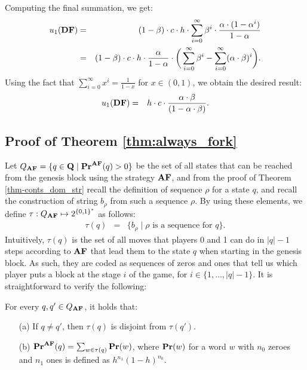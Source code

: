Computing the final summation, we get:
\begin{eqnarray*}	
u_1(\text{\rm {\bf DF}}) & = & (1-\beta) \cdot c \cdot h\cdot \sum_{i=0}^{\infty}\beta^{i} \cdot \frac{\alpha\cdot (1-\alpha^i)}{1-\alpha}\\
 & = & (1-\beta) \cdot c \cdot h\cdot \frac{\alpha}{1-\alpha} \cdot \bigg(\sum_{i=0}^{\infty}\beta^{i} - \sum_{i=0}^{\infty}(\alpha \cdot \beta)^i \bigg).
\end{eqnarray*}
Using the fact that $\sum_{i=0}^{\infty}x^i= \frac{1}{1-x}$ for $x \in (0,1)$, we obtain the desired result:
\begin{eqnarray*}
u_1(\text{\rm {\bf DF}}) & = & h\cdot c\cdot\frac{\alpha\cdot\beta}{(1-\alpha\cdot\beta)}.
\end{eqnarray*}

\subsection{Proof of Theorem \ref{thm:always_fork}}
Let $Q_{\text{\rm {\bf AF}}} = \{q \in \mathbf{Q} \mid \mathbf{Pr}^{\text{\rm {\bf AF}}}(q) > 0\}$ be the set of all states that can be reached from the genesis block using the strategy $\text{\rm {\bf AF}}$, and from the proof of Theorem \ref{thm-conts_dom_str} recall the definition of sequence $\rho$ for a state $q$, and recall the construction of string $b_\rho$ from such a sequence $\rho$.
By using these elements, we define $\tau:Q_{\text{\rm {\bf AF}}} \mapsto 2^{\{0,1\}^*}$ as follows:
\begin{eqnarray*}
\tau(q) & = & \{ b_\rho \mid \rho \text{ is a sequence for } q\}.
\end{eqnarray*}
Intuitively, $\tau(q)$ is the set of all moves that players 0 and 1 can do in $|q|-1$ steps according to $\text{\rm {\bf AF}}$ that lead them to the state $q$ when starting in the genesis block. As such, they are coded as sequences of zeros and ones that tell us which player puts a block at the stage $i$ of the game, for $i \in \{ 1,\ldots, |q|-1\}$. It is straightforward to verify the following:
\begin{myclaim}\label{claim-words-app} For every $q, q'\in Q_{\text{\rm {\bf AF}}}$, it holds that:
\begin{itemize}
\item[(a)] If $q\neq q'$, then $\tau(q)$ is disjoint from $\tau(q')$.
\item[(b)] $\mathbf{Pr}^{\text{\rm {\bf AF}}}(q) = \sum_{w \in \tau(q)} \mathbf{Pr}(w)$, where $\mathbf{Pr}(w)$ for a word $w$ with $n_0$ zeroes and $n_1$ ones is  defined as 
$h^{n_1}(1-h)^{n_0}$.
\end{itemize}
\end{myclaim}
